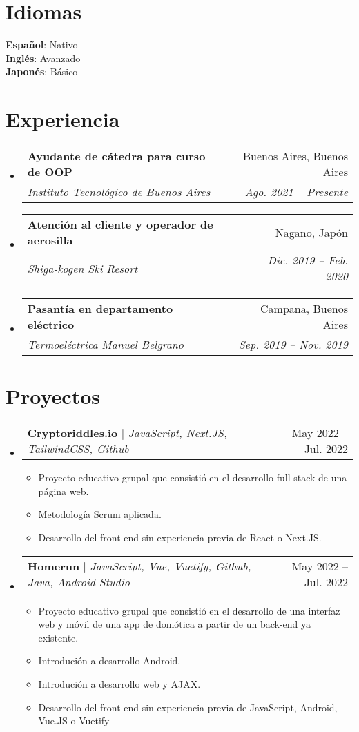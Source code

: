 \documentclass[letterpaper,11pt]{article}
\makeatletter
\newcommand{\resumeItem}[1]{
  \item\small{
    {#1 \vspace{-2pt}}
  }
}
\newcommand{\resumeSubheading}[4]{
  \vspace{-2pt}\item
    \begin{tabular*}{0.97\textwidth}[t]{l@{\extracolsep{\fill}}r}
      \textbf{#1} & #2 \\
      \textit{\small#3} & \textit{\small #4} \\
    \end{tabular*}\vspace{-7pt}
}
\newcommand{\resumeSubSubheading}[2]{
    \item
    \begin{tabular*}{0.97\textwidth}{l@{\extracolsep{\fill}}r}
      \textit{\small#1} & \textit{\small #2} \\
    \end{tabular*}\vspace{-7pt}
}
\newcommand{\resumeProjectHeading}[2]{
    \item
    \begin{tabular*}{0.97\textwidth}{l@{\extracolsep{\fill}}r}
      \small#1 & #2 \\
    \end{tabular*}\vspace{-7pt}
}
\newcommand{\resumeSubHeadingListStart}{\begin{itemize}[leftmargin=0.15in, label={}]}
\newcommand{\resumeSubHeadingListEnd}{\end{itemize}}
\newcommand{\resumeItemListStart}{\begin{itemize}}
\newcommand{\resumeItemListEnd}{\end{itemize}\vspace{-5pt}}
\makeatother
\begin{document}
\section{Idiomas}
 \begin{itemize}[leftmargin=0.15in, label={}]
    \small{\item{
     \textbf{Español}{: Nativo} \\
     \textbf{Inglés}{: Avanzado} \\
     \textbf{Japonés}{: Básico}
    }}
 \end{itemize}


\section{Experiencia}
  \resumeSubHeadingListStart
  \resumeSubheading
  {Ayudante de cátedra para curso de OOP}{Buenos Aires, Buenos Aires}
  {Instituto Tecnológico de Buenos Aires}{Ago. 2021 -- Presente}
  \resumeSubheading
  {Atención al cliente y operador de aerosilla}{Nagano, Japón}
  {Shiga-kogen Ski Resort}{Dic. 2019 -- Feb. 2020}
    \resumeSubheading
    {Pasantía en departamento eléctrico}{Campana, Buenos Aires}
      {Termoeléctrica Manuel Belgrano}{Sep. 2019 -- Nov. 2019}


   

  \resumeSubHeadingListEnd


\section{Proyectos}
    \resumeSubHeadingListStart
      \resumeProjectHeading
          {\textbf{Cryptoriddles.io} $|$ \emph{JavaScript, Next.JS, TailwindCSS, Github}}{May 2022 -- Jul. 2022}
          \resumeItemListStart
          \resumeItem{Proyecto educativo grupal que consistió en el desarrollo full-stack de una página web.}
          \resumeItem{Metodología Scrum aplicada.}
            \resumeItem{Desarrollo del front-end sin experiencia previa de React o Next.JS.}
          \resumeItemListEnd
      \resumeProjectHeading
          {\textbf{Homerun} $|$ \emph{JavaScript, Vue, Vuetify, Github, Java, Android Studio}}{May 2022 -- Jul. 2022}
          \resumeItemListStart
          \resumeItem{Proyecto educativo grupal que consistió en el desarrollo de una interfaz web y móvil de una app de domótica a partir de un back-end ya existente.}
          \resumeItem{Introdución a desarrollo Android.}
          \resumeItem{Introdución a desarrollo web y AJAX.}
            \resumeItem{Desarrollo del front-end sin experiencia previa de JavaScript, Android, Vue.JS o Vuetify}
          \resumeItemListEnd
    \resumeSubHeadingListEnd
\end{document}
